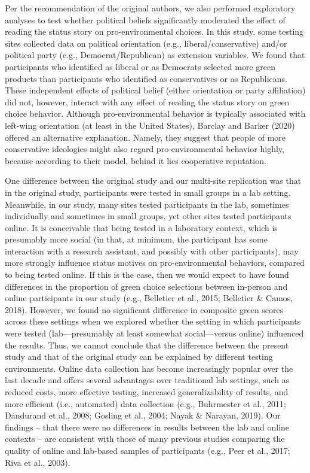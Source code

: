 \documentclass[
]{article}
\begin{document}
Per the recommendation of the original authors, we also performed
exploratory analyses to test whether political beliefs significantly
moderated the effect of reading the status story on pro-environmental
choices. In this study, some testing sites collected data on political
orientation (e.g., liberal/conservative) and/or political party (e.g.,
Democrat/Republican) as extension variables. We found that participants
who identified as liberal or as Democrats selected more green products
than participants who identified as conservatives or as Republicans.
These independent effects of political belief (either orientation or
party affiliation) did not, however, interact with any effect of reading
the status story on green choice behavior. Although pro-environmental
behavior is typically associated with left-wing orientation (at least in
the United States), Barclay and Barker (2020) offered an alternative
explanation. Namely, they suggest that people of more conservative
ideologies might also regard pro-environmental behavior highly, because
according to their model, behind it lies cooperative reputation.

One difference between the original study and our multi-site replication
was that in the original study, participants were tested in small groups
in a lab setting. Meanwhile, in our study, many sites tested
participants in the lab, sometimes individually and sometimes in small
groups, yet other sites tested participants online. It is conceivable
that being tested in a laboratory context, which is presumably more
social (in that, at minimum, the participant has some interaction with a
research assistant, and possibly with other participants), may more
strongly influence status motives on pro-environmental behaviors,
compared to being tested online. If this is the case, then we would
expect to have found differences in the proportion of green choice
selections between in-person and online participants in our study (e.g.,
Belletier et al., 2015; Belletier \& Camos, 2018). However, we found no
significant difference in composite green scores across these settings
when we explored whether the setting in which participants were tested
(lab---presumably at least somewhat social---versus online) influenced
the results. Thus, we cannot conclude that the difference between the
present study and that of the original study can be explained by
different testing environments. Online data collection has become
increasingly popular over the last decade and offers several advantages
over traditional lab settings, such as reduced costs, more effective
testing, increased generalizability of results, and more efficient
(i.e., automated) data collection (e.g., Buhrmester et al., 2011;
Dandurand et al., 2008; Gosling et al., 2004; Nayak \& Narayan, 2019).
Our findings -- that there were no differences in results between the
lab and online contexts -- are consistent with those of many previous
studies comparing the quality of online and lab-based samples of
participants (e.g., Peer et al., 2017; Riva et al., 2003).
\end{document}
